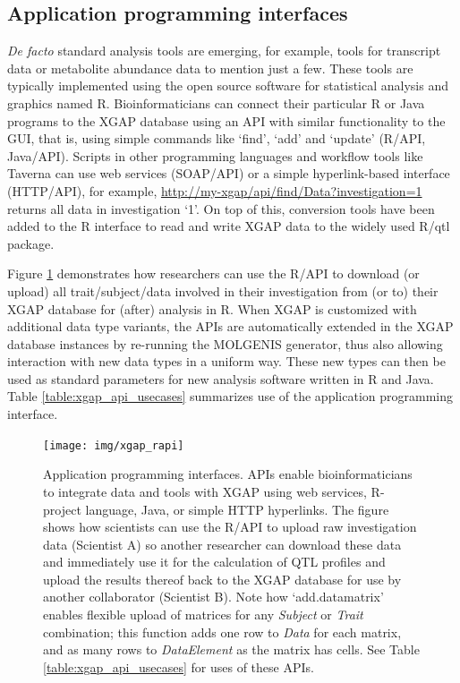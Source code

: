 \subsection{Application programming interfaces}
\textsl{De facto} standard analysis tools are emerging, for example, tools for transcript data\cite{Carey_2006, Alberts_2007, Broman_2003} or metabolite abundance data\cite{Fu_2007} to mention just a few.
These tools are typically implemented using the open source software for statistical analysis and graphics named R\cite{Ihaka_1996}.
Bioinformaticians can connect their particular R or Java programs to the XGAP database using an API with similar functionality to the GUI, that is, using simple commands like ‘find’, ‘add’ and ‘update’ (R/API, Java/API).
Scripts in other programming languages and workflow tools like Taverna\cite{Hull_2006} can use web services (SOAP/API) or a simple hyperlink-based interface (HTTP/API), for example, \url{http://my-xgap/api/find/Data?investigation=1} returns all data in investigation ‘1’.
On top of this, conversion tools have been added to the R interface to read and write XGAP data to the widely used R/qtl package\cite{Broman_2003}.

Figure \ref{fig:xgap_rapi} demonstrates how researchers can use the R/API to download (or upload) all trait/subject/data involved in their investigation from (or to) their XGAP database for (after) analysis in R.
When XGAP is customized with additional data type variants, the APIs are automatically extended in the XGAP database instances by re-running the MOLGENIS generator, thus also allowing interaction with new data types in a uniform way.
These new types can then be used as standard parameters for new analysis software written in R and Java.
Table \ref{table:xgap_api_usecases} summarizes use of the application programming interface.

\begin{figure}
	\texttt{[image: img/xgap\_rapi]}
	\caption[Application programming interfaces]{Application programming interfaces. APIs enable bioinformaticians to integrate data and tools with XGAP using web services, R-project language, Java, or simple HTTP hyperlinks. The figure shows how scientists can use the R/API to upload raw investigation data (Scientist A) so another researcher can download these data and immediately use it for the calculation of QTL profiles and upload the results thereof back to the XGAP database for use by another collaborator (Scientist B). Note how ‘add.datamatrix’ enables flexible upload of matrices for any \textsl{Subject} or \textsl{Trait} combination; this function adds one row to \textsl{Data} for each matrix, and as many rows to \textsl{DataElement} as the matrix has cells. See Table \ref{table:xgap_api_usecases} for uses of these APIs.}
	\label{fig:xgap_rapi}
\end{figure}

